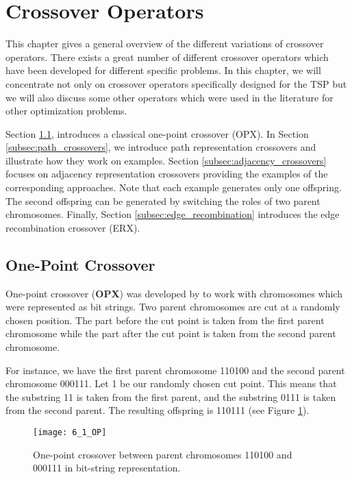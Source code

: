 \section{Crossover Operators}
\label{sec:crossover}

This chapter gives a general overview of the different variations of crossover operators. There exists a great number of different crossover operators which have been developed for different specific problems. In this chapter, we will concentrate not only on crossover operators specifically designed for the TSP but we will also discuss some other operators which were used in the literature for other optimization problems. \par 

Section \ref{subsec:opx},  introduces a classical one-point crossover (OPX). In Section \ref{subsec:path_crossovers}, we introduce path representation crossovers and illustrate how they work on examples. Section \ref{subsec:adjacency_crossovers} focuses on adjacency representation crossovers providing the examples of the corresponding approaches. Note that each example generates only one offspring. The second offspring can be generated by switching the roles of two parent chromosomes. Finally, Section \ref{subsec:edge_recombination} introduces the edge recombination crossover (ERX).\par

\subsection{One-Point Crossover}
\label{subsec:opx}

One-point crossover (\textbf{OPX}) was developed by \citeauthor{holland1975adaptation} \cite{holland1975adaptation} to work with chromosomes which were represented as bit strings. Two parent chromosomes are cut at a randomly chosen position. The part before the cut point is taken from the first parent chromosome while the part after the cut point is taken from the second parent chromosome. \par 
For instance, we have the first parent chromosome 110100 and the second parent chromosome 000111. Let 1 be our randomly chosen cut point. This means that the substring 11 is taken from the first parent, and the substring 0111 is taken from the second parent. The resulting offspring is 110111 (see Figure \ref{fig:6_1_OP}). 

\begin{figure}[htp] \centering
	\centering
	\texttt{[image: 6\_1\_OP]}
	\caption{One-point crossover between parent chromosomes 110100 and 000111 in bit-string representation.}
	\label{fig:6_1_OP}
\end{figure}

